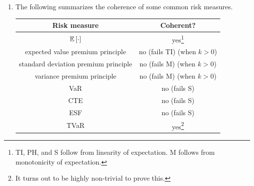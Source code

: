 \begin{enumerate}
\begin{itemize}
\item {} (M):
\[
\prob{X\le Y}=1\implies \rho(X)\le\rho(Y).
\]
\begin{note}
This means when a loss \(Y\) is not less than another loss \(X\) (with
probability 1), the required capital for protecting the loss \(Y\) should also
be not less than that for the loss \(X\).
\end{note}
\item {} (S):
\[
\rho(X+Y)\le\rho(X)+\rho(Y).
\]
\begin{note}
This means diversification (adding/combining different losses together) cannot
possibly make the resulting \emph{total} amount of capital required greater
than what we would have if there were no diversification.
\end{note}
\end{itemize}
A risk measure satisfying TI, PH, M, and S is called a .

\item \label{it:coherence-summary}
The following summarizes the coherence of some common risk measures.
\begin{center}
\begin{tabular}{cc}
\toprule
Risk measure&Coherent?\\
\midrule
\(\mathbb{E}\left[\cdot\right]\)&yes\footnote{TI, PH, and S follow from linearity
of expectation. M follows from monotonicity of expectation.}\\
expected value premium principle&no (fails TI) (when \(k>0\))\\
standard deviation premium principle&no (fails M) (when \(k>0\))\\
variance premium principle&no (fails M) (when \(k>0\))\\
VaR&no (fails S)\\
CTE&no (fails S)\\
ESF&no (fails S)\\
TVaR&yes\footnote{It turns out to be highly non-trivial to prove this.}\\
\bottomrule
\end{tabular}
\end{center}
\end{enumerate}
